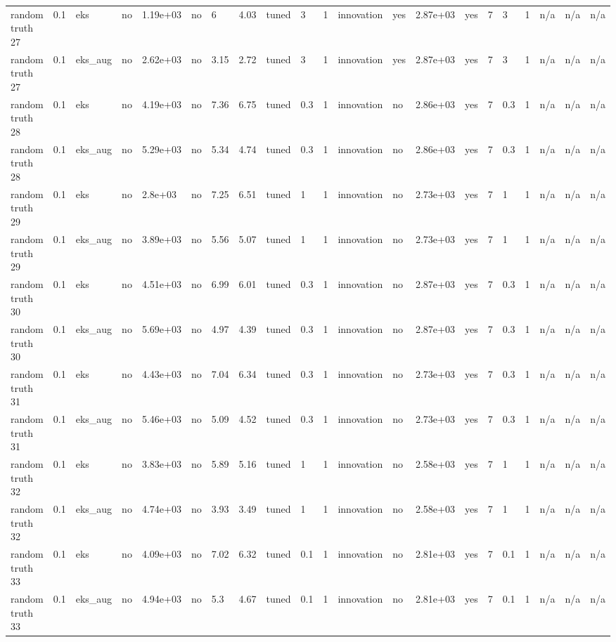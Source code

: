 \begin{table}[t]
\begin{tabular}{lllllllllllllllllllll}
random truth 27 & 0.1 & eks & no & 1.19e+03 & no & 6 & 4.03 & tuned & 3 & 1 & innovation & yes & 2.87e+03 & yes & 7 & 3 & 1 & n/a & n/a & n/a \\
random truth 27 & 0.1 & eks\_aug & no & 2.62e+03 & no & 3.15 & 2.72 & tuned & 3 & 1 & innovation & yes & 2.87e+03 & yes & 7 & 3 & 1 & n/a & n/a & n/a \\
random truth 28 & 0.1 & eks & no & 4.19e+03 & no & 7.36 & 6.75 & tuned & 0.3 & 1 & innovation & no & 2.86e+03 & yes & 7 & 0.3 & 1 & n/a & n/a & n/a \\
random truth 28 & 0.1 & eks\_aug & no & 5.29e+03 & no & 5.34 & 4.74 & tuned & 0.3 & 1 & innovation & no & 2.86e+03 & yes & 7 & 0.3 & 1 & n/a & n/a & n/a \\
random truth 29 & 0.1 & eks & no & 2.8e+03 & no & 7.25 & 6.51 & tuned & 1 & 1 & innovation & no & 2.73e+03 & yes & 7 & 1 & 1 & n/a & n/a & n/a \\
random truth 29 & 0.1 & eks\_aug & no & 3.89e+03 & no & 5.56 & 5.07 & tuned & 1 & 1 & innovation & no & 2.73e+03 & yes & 7 & 1 & 1 & n/a & n/a & n/a \\
random truth 30 & 0.1 & eks & no & 4.51e+03 & no & 6.99 & 6.01 & tuned & 0.3 & 1 & innovation & no & 2.87e+03 & yes & 7 & 0.3 & 1 & n/a & n/a & n/a \\
random truth 30 & 0.1 & eks\_aug & no & 5.69e+03 & no & 4.97 & 4.39 & tuned & 0.3 & 1 & innovation & no & 2.87e+03 & yes & 7 & 0.3 & 1 & n/a & n/a & n/a \\
random truth 31 & 0.1 & eks & no & 4.43e+03 & no & 7.04 & 6.34 & tuned & 0.3 & 1 & innovation & no & 2.73e+03 & yes & 7 & 0.3 & 1 & n/a & n/a & n/a \\
random truth 31 & 0.1 & eks\_aug & no & 5.46e+03 & no & 5.09 & 4.52 & tuned & 0.3 & 1 & innovation & no & 2.73e+03 & yes & 7 & 0.3 & 1 & n/a & n/a & n/a \\
random truth 32 & 0.1 & eks & no & 3.83e+03 & no & 5.89 & 5.16 & tuned & 1 & 1 & innovation & no & 2.58e+03 & yes & 7 & 1 & 1 & n/a & n/a & n/a \\
random truth 32 & 0.1 & eks\_aug & no & 4.74e+03 & no & 3.93 & 3.49 & tuned & 1 & 1 & innovation & no & 2.58e+03 & yes & 7 & 1 & 1 & n/a & n/a & n/a \\
random truth 33 & 0.1 & eks & no & 4.09e+03 & no & 7.02 & 6.32 & tuned & 0.1 & 1 & innovation & no & 2.81e+03 & yes & 7 & 0.1 & 1 & n/a & n/a & n/a \\
random truth 33 & 0.1 & eks\_aug & no & 4.94e+03 & no & 5.3 & 4.67 & tuned & 0.1 & 1 & innovation & no & 2.81e+03 & yes & 7 & 0.1 & 1 & n/a & n/a & n/a \\

\end{tabular}
\end{table}
